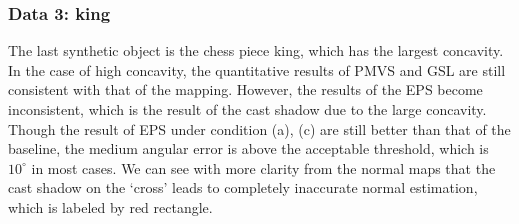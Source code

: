 \subsubsection{Data 3: king}
The last synthetic object is the chess piece king, which has the largest concavity. In the case of high concavity, the quantitative results of PMVS and GSL are still consistent with that of the mapping. However, the results of the EPS become inconsistent, which is the result of the cast shadow due to the large concavity. Though the result of EPS under condition (a), (c) are still better than that of the baseline, the medium angular error is above the acceptable threshold, which is $10^\circ$ in most cases. We can see with more clarity from the normal maps that the cast shadow on the `cross' leads to completely inaccurate normal estimation, which is labeled by red rectangle.
